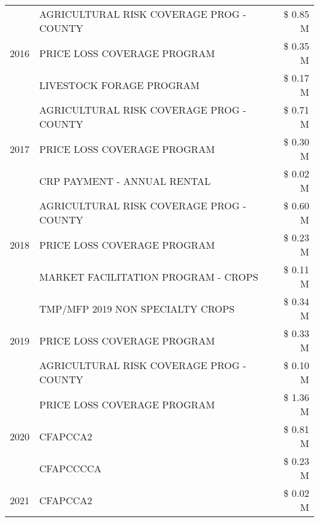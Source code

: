 \begin{tabular}{llr}
\cline{1-3}
\multirow[t]{3}{*}{2016} & AGRICULTURAL RISK COVERAGE PROG - COUNTY      & \$ 0.85 M \\
 & PRICE LOSS COVERAGE PROGRAM                   & \$ 0.35 M \\
 & LIVESTOCK FORAGE PROGRAM                      & \$ 0.17 M \\
\cline{1-3}
\multirow[t]{3}{*}{2017} & AGRICULTURAL RISK COVERAGE PROG - COUNTY & \$ 0.71 M \\
 & PRICE LOSS COVERAGE PROGRAM & \$ 0.30 M \\
 & CRP PAYMENT - ANNUAL RENTAL & \$ 0.02 M \\
\cline{1-3}
\multirow[t]{3}{*}{2018} & AGRICULTURAL RISK COVERAGE PROG - COUNTY & \$ 0.60 M \\
 & PRICE LOSS COVERAGE PROGRAM & \$ 0.23 M \\
 & MARKET FACILITATION PROGRAM - CROPS & \$ 0.11 M \\
\cline{1-3}
\multirow[t]{3}{*}{2019} & TMP/MFP 2019 NON SPECIALTY CROPS & \$ 0.34 M \\
 & PRICE LOSS COVERAGE PROGRAM & \$ 0.33 M \\
 & AGRICULTURAL RISK COVERAGE PROG - COUNTY & \$ 0.10 M \\
\cline{1-3}
\multirow[t]{3}{*}{2020} & PRICE LOSS COVERAGE PROGRAM & \$ 1.36 M \\
 & CFAPCCA2 & \$ 0.81 M \\
 & CFAPCCCCA & \$ 0.23 M \\
\cline{1-3}
2021 & CFAPCCA2 & \$ 0.02 M \\
\cline{1-3}
\bottomrule
\end{tabular}
